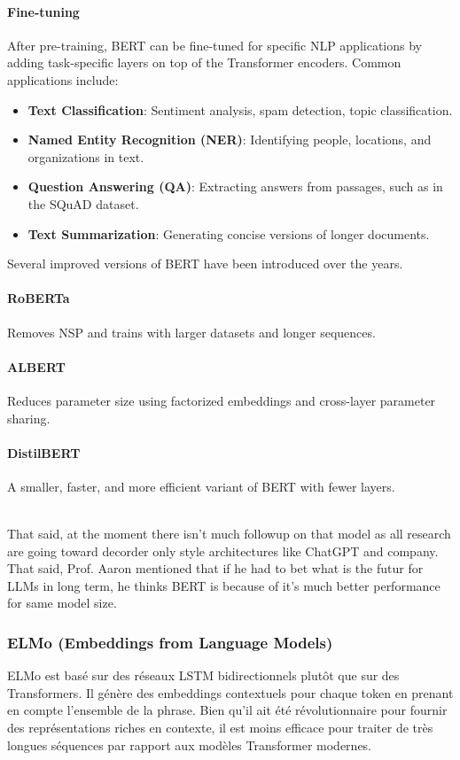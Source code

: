 \documentclass{article}
\begin{document}
\paragraph{Fine-tuning}
After pre-training, BERT can be fine-tuned for specific NLP applications by adding task-specific layers on top of the Transformer encoders. Common applications include:
\begin{itemize}
    \item \textbf{Text Classification}: Sentiment analysis, spam detection, topic classification.
    \item \textbf{Named Entity Recognition (NER)}: Identifying people, locations, and organizations in text.
    \item \textbf{Question Answering (QA)}: Extracting answers from passages, such as in the SQuAD dataset.
    \item \textbf{Text Summarization}: Generating concise versions of longer documents.
\end{itemize}

Several improved versions of BERT have been introduced over the years.

\paragraph{RoBERTa} Removes NSP and trains with larger datasets and longer sequences.

\paragraph{ALBERT} Reduces parameter size using factorized embeddings and cross-layer parameter sharing.

\paragraph{DistilBERT} A smaller, faster, and more efficient variant of BERT with fewer layers.

\\

That said, at the moment there isn't much followup on that model as all research are going toward decorder only style architectures like ChatGPT and company. That said, Prof. Aaron mentioned that if he had to bet what is the futur for LLMs in long term, he thinks BERT is because of it's much better performance for same model size.

\subsubsection{ELMo (Embeddings from Language Models)}
ELMo est basé sur des réseaux LSTM bidirectionnels plutôt que sur des Transformers. Il génère des embeddings contextuels pour chaque token en prenant en compte l'ensemble de la phrase. Bien qu'il ait été révolutionnaire pour fournir des représentations riches en contexte, il est moins efficace pour traiter de très longues séquences par rapport aux modèles Transformer modernes.
\end{document}
